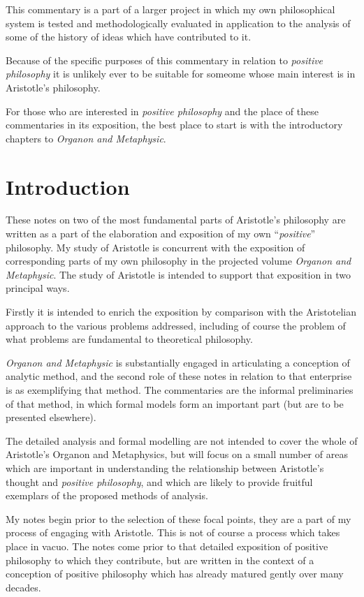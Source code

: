 This commentary is a part of a larger project in which my own philosophical system is tested and methodologically evaluated in application to the analysis of some of the history of ideas which have contributed to it.

Because of the specific purposes of this commentary in relation to \emph{positive philosophy} it is unlikely ever to be suitable for someome whose main interest is in Aristotle's philosophy.

For those who are interested in \emph{positive philosophy} and the place of these commentaries in its exposition, the best place to start is with the introductory chapters to \emph{Organon and Metaphysic}\cite{rbjbOrgMetap}.

\mainmatter

\chapter{Introduction}

These notes on two of the most fundamental parts of Aristotle's philosophy are written as a part of the elaboration and exposition of my own ``\emph{positive}'' philosophy.
My study of Aristotle is concurrent with the exposition of corresponding parts of my own philosophy in the projected volume \emph{Organon and Metaphysic}\cite{rbjbOrgMetap}.
The study of Aristotle is intended to support that exposition in two principal ways.

Firstly it is intended to enrich the exposition by comparison with the Aristotelian approach to the various problems addressed, including of course the problem of what problems are fundamental to theoretical philosophy.

\emph{Organon and Metaphysic} is substantially engaged in articulating a conception of analytic method, and the second role of these notes in relation to that enterprise is as exemplifying that method.
The commentaries are the informal preliminaries of that method, in which formal models form an important part (but are to be presented elsewhere).

The detailed analysis and formal modelling are not intended to cover the whole of Aristotle's Organon and Metaphysics, but will focus on a small number of areas which are important in understanding the relationship between Aristotle's thought and \emph{positive philosophy}, and which are likely to provide fruitful exemplars of the proposed methods of analysis.

My notes begin prior to the selection of these focal points, they are a part of my process of engaging with Aristotle.
This is not of course a process which takes place in vacuo.
The notes come prior to that detailed exposition of positive philosophy to which they contribute, but are written in the context of a conception of positive philosophy which has already matured gently over many decades.

